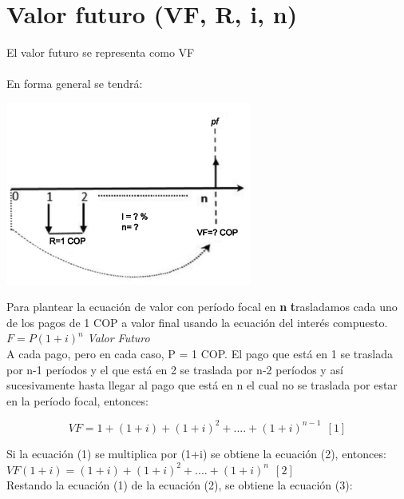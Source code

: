 	\section{Valor futuro (VF, R, i, n)}
	El valor futuro se representa como VF
	\\\\
	En forma general se tendrá:

	\begin{center}
		\includegraphics[height=6cm]{4_Capitulo/img/ejemplos/4_7.pdf}
	\end{center}

	Para plantear la ecuación de valor con período focal en \textbf n \textbf trasladamos cada uno de los pagos de 1 COP a valor final usando la ecuación del interés  compuesto.\\


$F= P (1+i)^{n}$ \hspace{35pt} \textit{Valor Futuro} \\


	A cada pago, pero en cada caso, P = 1 COP. El pago que está en 1 se traslada por n-1 períodos y el que está en 2 se traslada por  n-2 períodos y así sucesivamente hasta llegar al pago que está en n  el cual no se traslada por estar  en la período focal, entonces:

	\begin{equation*}
		VF=1+ (1+i) +(1+i)^{2}+....+(1+i)^{n-1}  \ \ [1]
	\end{equation*}

	Si la ecuación (1) se multiplica por (1+i) se obtiene la ecuación (2), entonces:\\


$VF(1+i)= (1+i) +(1+i)^{2}+....+(1+i)^{n} \ \ [2]$\\

	Restando la ecuación (1) de la ecuación (2), se obtiene la ecuación (3):\\

